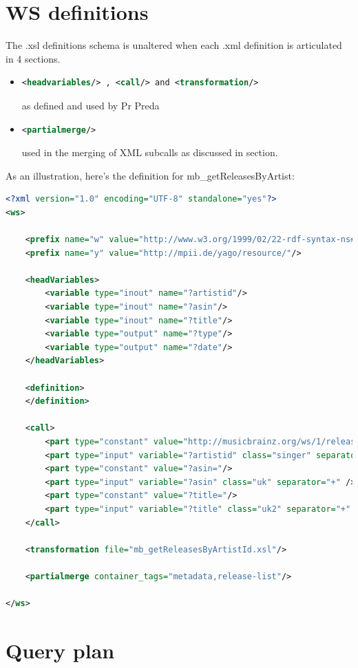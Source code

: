 \documentclass[11pt]{article}
\begin{document}
\section{WS definitions}
The .xsl definitions schema is unaltered when each .xml definition is articulated in 4 sections.
\begin{itemize}
\item \begin{lstlisting}[language=XML]
<headvariables/> , <call/> and <transformation/>
\end{lstlisting}
as defined and used by Pr Preda
\item \begin{lstlisting}[language=XML]
<partialmerge/>
\end{lstlisting}
used in the merging of XML subcalls as discussed in section.\\
\end{itemize}
As an illustration, here's the definition for mb\_getReleasesByArtist:
\begin{lstlisting}[language=XML]
<?xml version="1.0" encoding="UTF-8" standalone="yes"?>
<ws>

	<prefix name="w" value="http://www.w3.org/1999/02/22-rdf-syntax-ns#"/>
	<prefix name="y" value="http://mpii.de/yago/resource/"/>
	
	<headVariables>
        <variable type="inout" name="?artistid"/>
        <variable type="inout" name="?asin"/>
        <variable type="inout" name="?title"/>
        <variable type="output" name="?type"/>
        <variable type="output" name="?date"/>
    </headVariables>
    
	<definition>
	</definition>
	
	<call>
		<part type="constant" value="http://musicbrainz.org/ws/1/release/?artistid="/>
		<part type="input" variable="?artistid" class="singer" separator="+" />
		<part type="constant" value="?asin="/>
		<part type="input" variable="?asin" class="uk" separator="+" />
		<part type="constant" value="?title="/>
		<part type="input" variable="?title" class="uk2" separator="+" />
	</call>
	
	<transformation file="mb_getReleasesByArtistId.xsl"/>
	
	<partialmerge container_tags="metadata,release-list"/>

</ws>
\end{lstlisting}
\section{Query plan}
\end{document}
